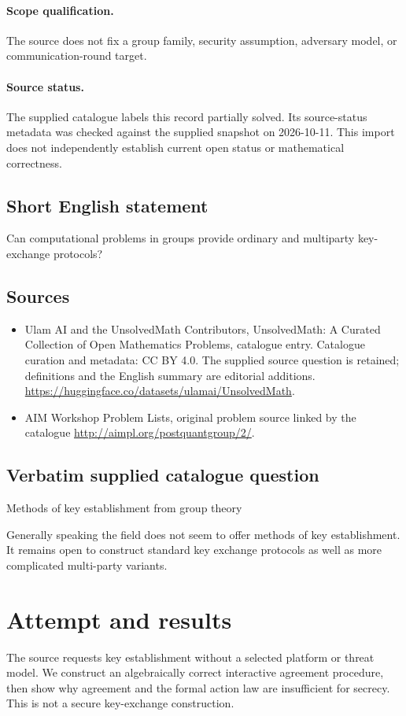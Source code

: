 \documentclass[11pt]{article}
\begin{document}
\paragraph{Scope qualification.}
The source does not fix a group family, security assumption, adversary model, or communication-round target.
\paragraph{Source status.}
The supplied catalogue labels this record partially solved. Its source-status metadata was checked against the supplied snapshot on 2026-10-11. This import does not independently establish current open status or mathematical correctness.
\subsection{Short English statement}
Can computational problems in groups provide ordinary and multiparty key-exchange protocols?
\subsection{Sources}
\begin{itemize}
\item[S1] Ulam AI and the UnsolvedMath Contributors, UnsolvedMath: A Curated Collection of Open Mathematics Problems, catalogue entry. Catalogue curation and metadata: CC BY 4.0. The supplied source question is retained; definitions and the English summary are editorial additions.
\url{https://huggingface.co/datasets/ulamai/UnsolvedMath}.
\item[S2] AIM Workshop Problem Lists, original problem source linked by the catalogue
\url{http://aimpl.org/postquantgroup/2/}.
\end{itemize}
\subsection{Verbatim supplied catalogue question}
Methods of key establishment from group theory

Generally speaking the field does not seem to offer methods of key establishment. It remains open to construct standard key exchange protocols as well as more complicated multi-party variants.

\section{Attempt and results}
The source requests key establishment without a selected platform or threat
model. We construct an algebraically correct interactive agreement procedure,
then show why agreement and the formal action law are insufficient for secrecy.
This is not a secure key-exchange construction.
\end{document}
